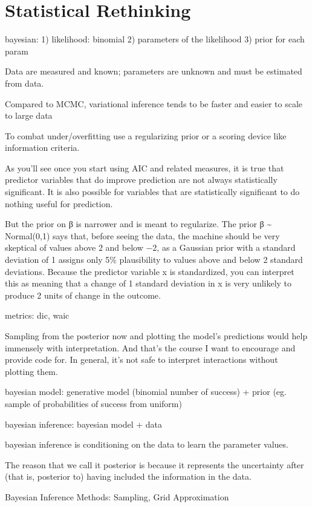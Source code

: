 \documentclass[]{book}
\begin{document}
\section{Statistical Rethinking}\label{statistical-rethinking}

bayesian: 1) likelihood: binomial 2) parameters of the likelihood 3)
prior for each param

Data are measured and known; parameters are unknown and must be
estimated from data.

Compared to MCMC, variational inference tends to be faster and easier to
scale to large data

To combat under/overfitting use a regularizing prior or a scoring device
like information criteria.

As you'll see once you start using AIC and related measures, it is true
that predictor variables that do improve prediction are not always
statistically significant. It is also possible for variables that are
statistically significant to do nothing useful for prediction.

But the prior on β is narrower and is meant to regularize. The prior β
\textasciitilde{} Normal(0,1) says that, before seeing the data, the
machine should be very skeptical of values above 2 and below −2, as a
Gaussian prior with a standard deviation of 1 assigns only 5\%
plausibility to values above and below 2 standard deviations. Because
the predictor variable x is standardized, you can interpret this as
meaning that a change of 1 standard deviation in x is very unlikely to
produce 2 units of change in the outcome.

metrics: dic, waic

Sampling from the posterior now and plotting the model's predictions
would help immensely with interpretation. And that's the course I want
to encourage and provide code for. In general, it's not safe to
interpret interactions without plotting them.

bayesian model: generative model (binomial number of success) + prior
(eg. sample of probabilities of success from uniform)

bayesian inference: bayesian model + data

bayesian inference is conditioning on the data to learn the parameter
values.

The reason that we call it posterior is because it represents the
uncertainty after (that is, posterior to) having included the
information in the data.

Bayesian Inference Methods: Sampling, Grid Approximation
\end{document}
